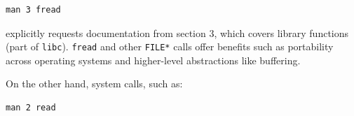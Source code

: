 \documentclass[../../compsys.tex]{subfiles}
\begin{document}
\begin{center}
\begin{verbatim}
man 3 fread
\end{verbatim}
\end{center}

explicitly requests documentation from section 3, which covers library functions (part of \texttt{libc}). \texttt{fread} and other \texttt{FILE*} calls offer benefits such as portability across operating systems and higher-level abstractions like buffering.

On the other hand, system calls, such as:
\begin{center}
\begin{verbatim}
man 2 read
\end{verbatim}
\end{center}
\end{document}
